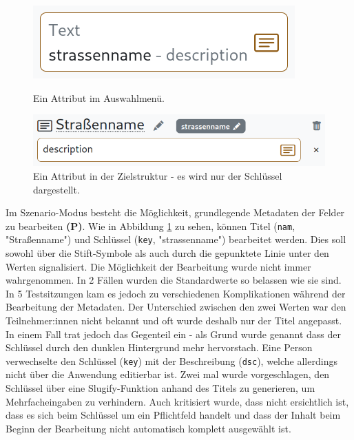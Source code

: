 \begin{figure}[!ht]
  \includegraphics[width=\linewidth]{assets/attribute-source.png}
  \caption{Ein Attribut im Auswahlmenü.}
  \label{fig:attribute-source}
  \endminipage
  \hfill
  \includegraphics[width=\linewidth]{assets/attribute-target.png}
  \caption{Ein Attribut in der Zielstruktur - es wird nur der Schlüssel dargestellt.}
  \label{fig:attribute-target}
  \endminipage
\end{figure}

Im Szenario-Modus besteht die Möglichkeit, grundlegende Metadaten der Felder zu bearbeiten \textbf{(P)}. Wie in Abbildung \ref{fig:attribute-target} zu sehen, können Titel (\texttt{nam}, "Straßenname") und Schlüssel (\texttt{key}, "strassenname") bearbeitet werden. Dies soll sowohl über die Stift-Symbole als auch durch die gepunktete Linie unter den Werten signalisiert. Die Möglichkeit der Bearbeitung wurde nicht immer wahrgenommen. In 2 Fällen wurden die Standardwerte so belassen wie sie sind. In 5 Testsitzungen kam es jedoch zu verschiedenen Komplikationen während der Bearbeitung der Metadaten. Der Unterschied zwischen den zwei Werten war den Teilnehmer:innen nicht bekannt und oft wurde deshalb nur der Titel angepasst. In einem Fall trat jedoch das Gegenteil ein - als Grund wurde genannt dass der Schlüssel durch den dunklen Hintergrund mehr hervorstach. Eine Person verwechselte den Schlüssel (\texttt{key}) mit der Beschreibung (\texttt{dsc}), welche allerdings nicht über die Anwendung editierbar ist. Zwei mal wurde vorgeschlagen, den Schlüssel über eine Slugify-Funktion anhand des Titels zu generieren, um Mehrfacheingaben zu verhindern. Auch kritisiert wurde, dass nicht ersichtlich ist, dass es sich beim Schlüssel um ein Pflichtfeld handelt und dass der Inhalt beim Beginn der Bearbeitung nicht automatisch komplett ausgewählt ist.

